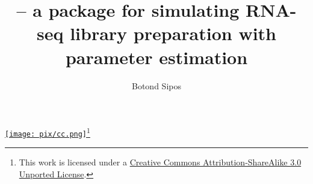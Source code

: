 \documentclass[a4paper, twosided]{article}
\title{\rlsim -- a package for simulating RNA-seq library preparation with parameter estimation}
\author{Botond Sipos}
\begin{document}
\maketitle
\begin{center}
\href{http://creativecommons.org/licenses/by-sa/3.0/}{\texttt{[image: pix/cc.png]}}\footnote{This work is licensed under a \href{http://creativecommons.org/licenses/by-sa/3.0/}{Creative Commons Attribution-ShareAlike 3.0 Unported License}.}
\end{center}

\tableofcontents









\end{document}
